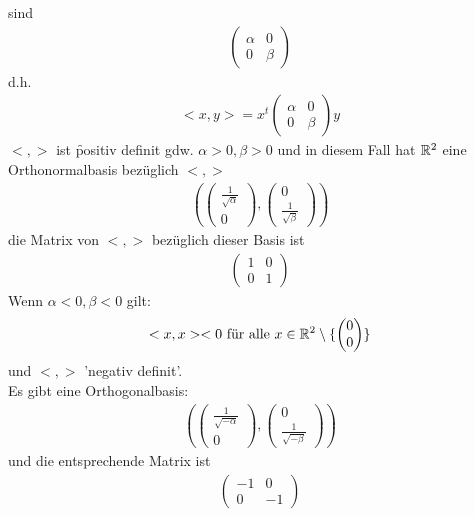 sind
\begin{align}
\begin{pmatrix} \alpha & 0 \\ 0 & \beta\end{pmatrix}
\end{align}
d.h.
\begin{align}
< x, y > = x^t \begin{pmatrix} \alpha & 0 \\ 0 & \beta\end{pmatrix} y
\end{align}
$<, >$ ist \f{positiv definit} gdw. $\alpha > 0, \beta > 0$ und in diesem Fall hat $\mathbb{R}^2$ eine Orthonormalbasis bezüglich $<, >$
\begin{align}
(\begin{pmatrix} \frac{1}{\sqrt{\alpha}} \\ 0\end{pmatrix} , \begin{pmatrix} 0 \\ \frac{1}{\sqrt{\beta}}\end{pmatrix})
\end{align}
die Matrix von $<, >$ bezüglich dieser Basis ist
\begin{align}
\begin{pmatrix} 1 & 0 \\ 0 & 1 \end{pmatrix}
\end{align}
Wenn $\alpha < 0, \beta < 0$ gilt:
\begin{align}
<x, x> < 0 \text{ für alle } x \in \mathbb{R}^2 \setminus \{\begin{pmatrix} 0 \\ 0\end{pmatrix}\}
\end{align}
und $<, >$ 'negativ definit'. \\
Es gibt eine Orthogonalbasis:
\begin{align}
(\begin{pmatrix} \frac{1}{\sqrt{-\alpha}} \\ 0\end{pmatrix} , \begin{pmatrix} 0 \\ \frac{1}{\sqrt{-\beta}}\end{pmatrix})
\end{align}
und die entsprechende Matrix ist
\begin{align}
 \begin{pmatrix} -1 & 0 \\ 0 & -1 \end{pmatrix}
\end{align}
